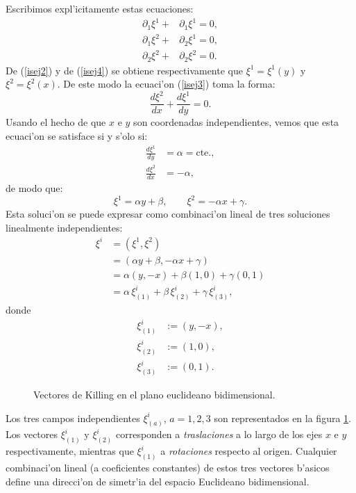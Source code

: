 Escribimos expl'icitamente estas ecuaciones:%
\begin{align}
\partial_1\xi^1+ & \partial_1\xi^1= 0, \label{isej2}\\
\partial_1\xi^2+ & \partial_2\xi^1= 0, \label{isej3} \\
\partial_2\xi^2+ & \partial_2\xi^2= 0.  \label{isej4}
\end{align}
De (\ref{isej2}) y de (\ref{isej4}) se obtiene respectivamente que $\xi
^1=\xi^1(y)$ y $\xi^2=\xi^2(x)$. De este modo la ecuaci'on (\ref{isej3}) toma la forma:
\begin{equation}
\frac{d\xi^2}{dx}+\frac{d\xi^1}{dy}=0.  \label{isej5}%
\end{equation}
Usando el hecho de que $x$ e $y$ son coordenadas independientes, vemos que
esta ecuaci'on se satisface si y s'olo si:
\begin{align}
\frac{d\xi^1}{dy}  &  =\alpha=\text{cte.},\label{isej6}\\
\frac{d\xi^2}{dx}  &  =-\alpha, \nonumber
\end{align}
de modo que:
\begin{equation}
\xi^1 =\alpha y+\beta, \qquad
\xi^2 =-\alpha x+\gamma. \label{isej7}
\end{equation}
Esta soluci'on se puede expresar como combinaci'on lineal de tres
soluciones linealmente independientes:
\begin{align}
\xi^i  &  =\left(  \xi^1,\xi^2\right)  \\
& =\left(  \alpha y+\beta,-\alpha x+\gamma\right) \\
  &  =\alpha\left(  y,-x\right)  +\beta\left(  1,0\right)
+\gamma\left(  0,1\right)  \\
 &  =\alpha\,\xi_{(1)}^i+\beta\,\xi_{(2)}^i+\gamma\,\xi_{(3)}^i, \nonumber
\end{align}
donde
\begin{align}
\xi_{(1)}^i  &  :=\left(  y,-x\right)  ,\\
\xi_{(2)}^i  &  :=\left(  1,0\right)  ,\\
\xi_{(3)}^i  &  :=\left(  0,1\right)  .
\end{align}
\begin{center}
\begin{figure}[H]
\centerline{}
\caption{Vectores de Killing en el plano euclideano bidimensional.}
\label{KE2}
\end{figure}
\end{center}
Los tres campos independientes $\xi^i_{(a)}$, $a=1,2,3$ son representados en la figura \ref{KE2}. Los vectores $\xi^i_{(1)}$ y $\xi^i_{(2)}$ corresponden a \textit{traslaciones} a lo largo de los ejes $x$ e $y$ respectivamente, mientras que $\xi^i_{(1)}$ a \textit{rotaciones} respecto al origen. Cualquier combinaci'on lineal (a coeficientes constantes) de estos tres vectores b'asicos define una direcci'on de simetr'ia del espacio Euclideano bidimensional.
